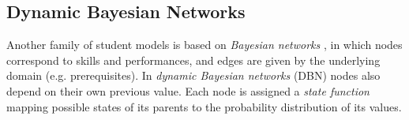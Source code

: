 %
%
%
%
%



\subsection{Dynamic Bayesian Networks}
\label{sec:dbn}

Another family of student models is based on \emph{Bayesian networks} \cite{probabilistic-ai},
in which nodes correspond to skills and performances,
and edges are given by the underlying domain (e.g. prerequisites).
In \emph{dynamic Bayesian networks} (DBN) \cite{dbn} nodes also depend
on their own previous value. %
Each node is assigned a \emph{state function} mapping possible states of its
parents to the probability distribution of its values.  %



